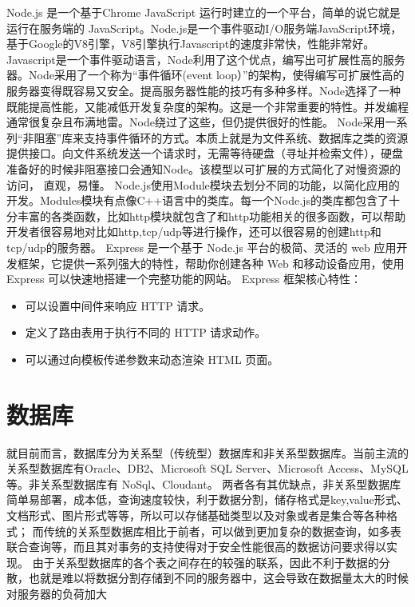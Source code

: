 Node.js 是一个基于Chrome JavaScript 运行时建立的一个平台，简单的说它就是运行在服务端的 JavaScript。Node.js是一个事件驱动I/O服务端JavaScript环境，基于Google的V8引擎，V8引擎执行Javascript的速度非常快，性能非常好。Javascript是一个事件驱动语言，Node利用了这个优点，编写出可扩展性高的服务器。Node采用了一个称为“事件循环(event loop）”的架构，使得编写可扩展性高的服务器变得既容易又安全。提高服务器性能的技巧有多种多样。Node选择了一种既能提高性能，又能减低开发复杂度的架构。这是一个非常重要的特性。并发编程通常很复杂且布满地雷。Node绕过了这些，但仍提供很好的性能。
Node采用一系列“非阻塞”库来支持事件循环的方式。本质上就是为文件系统、数据库之类的资源提供接口。向文件系统发送一个请求时，无需等待硬盘（寻址并检索文件），硬盘准备好的时候非阻塞接口会通知Node。该模型以可扩展的方式简化了对慢资源的访问， 直观，易懂。
Node.js使用Module模块去划分不同的功能，以简化应用的开发。Modules模块有点像C++语言中的类库。每一个Node.js的类库都包含了十分丰富的各类函数，比如http模块就包含了和http功能相关的很多函数，可以帮助开发者很容易地对比如http,tcp/udp等进行操作，还可以很容易的创建http和tcp/udp的服务器。
Express 是一个基于 Node.js 平台的极简、灵活的 web 应用开发框架，它提供一系列强大的特性，帮助你创建各种 Web 和移动设备应用，使用 Express 可以快速地搭建一个完整功能的网站。
Express 框架核心特性：
\begin{itemize}
	\item 可以设置中间件来响应 HTTP 请求。
	\item 定义了路由表用于执行不同的 HTTP 请求动作。
	\item 可以通过向模板传递参数来动态渲染 HTML 页面。
\end{itemize}

\section{数据库}
\label{sec:database}
就目前而言，数据库分为关系型（传统型）数据库和非关系型数据库。当前主流的关系型数据库有Oracle、DB2、Microsoft SQL Server、Microsoft Access、MySQL等。非关系型数据库有 NoSql、Cloudant。
两者各有其优缺点，非关系型数据库简单易部署，成本低，查询速度较快，利于数据分割，储存格式是key,value形式、文档形式、图片形式等等，所以可以存储基础类型以及对象或者是集合等各种格式；
而传统的关系型数据库相比于前者，可以做到更加复杂的数据查询，如多表联合查询等，而且其对事务的支持使得对于安全性能很高的数据访问要求得以实现。
由于关系型数据库的各个表之间存在的较强的联系，因此不利于数据的分散，也就是难以将数据分割存储到不同的服务器中，这会导致在数据量太大的时候对服务器的负荷加大

